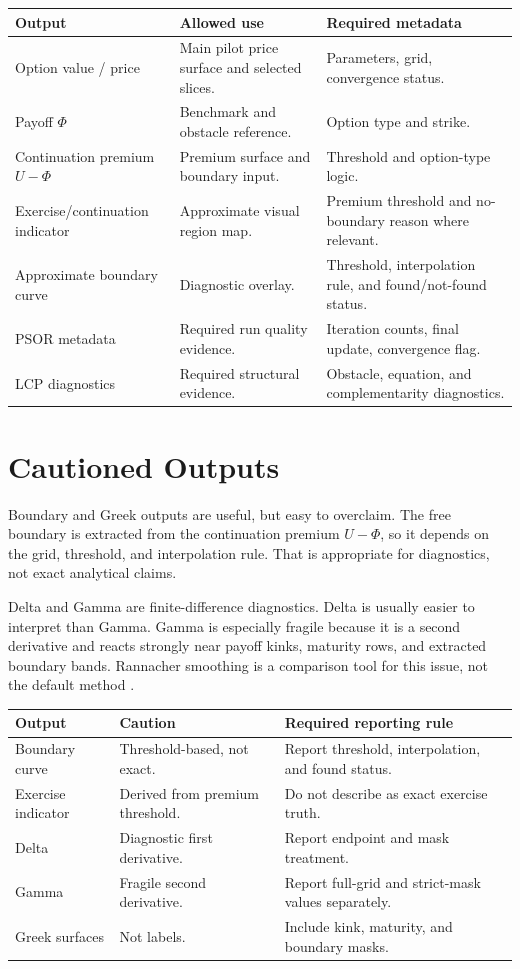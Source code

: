 \documentclass[11pt,a4paper]{article}
\begin{document}
\begin{longtable}{L{0.24\textwidth} L{0.35\textwidth} L{0.29\textwidth}}
\toprule
Output & Allowed use & Required metadata \\
\midrule
\endhead
Option value / price & Main pilot price surface and selected slices. & Parameters, grid, convergence status. \\
Payoff \(\Phi\) & Benchmark and obstacle reference. & Option type and strike. \\
Continuation premium \(U-\Phi\) & Premium surface and boundary input. & Threshold and option-type logic. \\
Exercise/continuation indicator & Approximate visual region map. & Premium threshold and no-boundary reason where relevant. \\
Approximate boundary curve & Diagnostic overlay. & Threshold, interpolation rule, and found/not-found status. \\
PSOR metadata & Required run quality evidence. & Iteration counts, final update, convergence flag. \\
LCP diagnostics & Required structural evidence. & Obstacle, equation, and complementarity diagnostics. \\
\bottomrule
\end{longtable}

\section{Cautioned Outputs}

Boundary and Greek outputs are useful, but easy to overclaim. The free boundary is extracted from
the continuation premium \(U-\Phi\), so it depends on the grid, threshold, and interpolation rule.
That is appropriate for diagnostics, not exact analytical claims.

Delta and Gamma are finite-difference diagnostics. Delta is usually easier to interpret than
Gamma. Gamma is especially fragile because it is a second derivative and reacts strongly near
payoff kinks, maturity rows, and extracted boundary bands. Rannacher smoothing is a comparison
tool for this issue, not the default method \citep{rannacher_1984}.

\begin{longtable}{L{0.26\textwidth} L{0.32\textwidth} L{0.31\textwidth}}
\toprule
Output & Caution & Required reporting rule \\
\midrule
\endhead
Boundary curve & Threshold-based, not exact. & Report threshold, interpolation, and found status. \\
Exercise indicator & Derived from premium threshold. & Do not describe as exact exercise truth. \\
Delta & Diagnostic first derivative. & Report endpoint and mask treatment. \\
Gamma & Fragile second derivative. & Report full-grid and strict-mask values separately. \\
Greek surfaces & Not labels. & Include kink, maturity, and boundary masks. \\
\bottomrule
\end{longtable}
\end{document}
